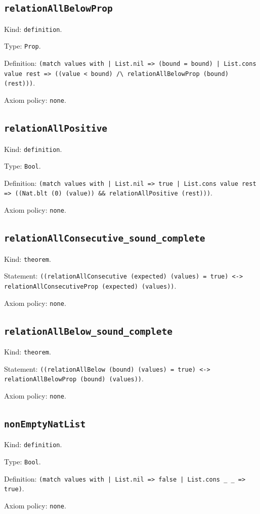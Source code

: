 \documentclass[11pt]{article}
\begin{document}
\subsection*{\texttt{relationAllBelowProp}}
\noindent Kind: \texttt{definition}.\par
\noindent Type: \texttt{Prop}.\par
\noindent Definition: \texttt{(match values with | List.nil => (bound = bound) | List.cons value rest => ((value < bound) /\textbackslash{} relationAllBelowProp (bound) (rest)))}.\par
\noindent Axiom policy: \texttt{none}.\par
\subsection*{\texttt{relationAllPositive}}
\noindent Kind: \texttt{definition}.\par
\noindent Type: \texttt{Bool}.\par
\noindent Definition: \texttt{(match values with | List.nil => true | List.cons value rest => ((Nat.blt (0) (value)) \&\& relationAllPositive (rest)))}.\par
\noindent Axiom policy: \texttt{none}.\par
\subsection*{\texttt{relationAllConsecutive\_sound\_complete}}
\noindent Kind: \texttt{theorem}.\par
\noindent Statement: \texttt{((relationAllConsecutive (expected) (values) = true) <-> relationAllConsecutiveProp (expected) (values))}.\par
\noindent Axiom policy: \texttt{none}.\par
\subsection*{\texttt{relationAllBelow\_sound\_complete}}
\noindent Kind: \texttt{theorem}.\par
\noindent Statement: \texttt{((relationAllBelow (bound) (values) = true) <-> relationAllBelowProp (bound) (values))}.\par
\noindent Axiom policy: \texttt{none}.\par
\subsection*{\texttt{nonEmptyNatList}}
\noindent Kind: \texttt{definition}.\par
\noindent Type: \texttt{Bool}.\par
\noindent Definition: \texttt{(match values with | List.nil => false | List.cons \_ \_ => true)}.\par
\noindent Axiom policy: \texttt{none}.\par
\end{document}
